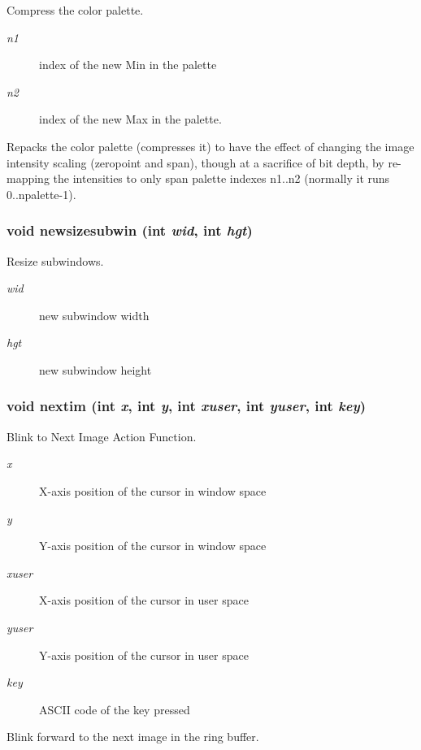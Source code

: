 Compress the color palette. 

\begin{Desc}
\item[Parameters:]
\begin{description}
\item[{\em n1}]index of the new Min in the palette \item[{\em n2}]index of the new Max in the palette.\end{description}
\end{Desc}
Repacks the color palette (compresses it) to have the effect of changing the image intensity scaling (zeropoint and span), though at a sacrifice of bit depth, by re-mapping the intensities to only span palette indexes n1..n2 (normally it runs 0..npalette-1). 
\subsubsection{\setlength{\rightskip}{0pt plus 5cm}void newsizesubwin (int {\em wid}, int {\em hgt})}\label{xtvutils_8c_a193}


Resize subwindows. 

\begin{Desc}
\item[Parameters:]
\begin{description}
\item[{\em wid}]new subwindow width \item[{\em hgt}]new subwindow height \end{description}
\end{Desc}
\subsubsection{\setlength{\rightskip}{0pt plus 5cm}void nextim (int {\em x}, int {\em y}, int {\em xuser}, int {\em yuser}, int {\em key})}\label{xtvutils_8c_a217}


Blink to Next Image Action Function. 

\begin{Desc}
\item[Parameters:]
\begin{description}
\item[{\em x}]X-axis position of the cursor in window space \item[{\em y}]Y-axis position of the cursor in window space \item[{\em xuser}]X-axis position of the cursor in user space \item[{\em yuser}]Y-axis position of the cursor in user space \item[{\em key}]ASCII code of the key pressed\end{description}
\end{Desc}
Blink forward to the next image in the ring buffer. 
